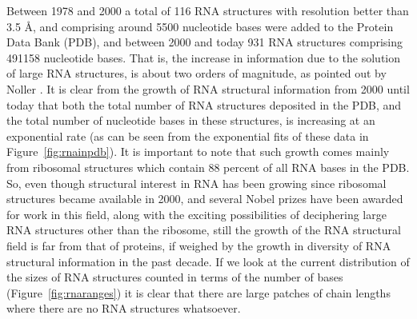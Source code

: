 \noindent Between  1978 and  2000 a total  of 116 RNA  structures with
resolution better than 3.5  \AA, and comprising around 5500 nucleotide
bases were added to the Protein  Data Bank (PDB), and between 2000 and
today  931  RNA  structures  comprising  491158  nucleotide
bases.  That  is, the increase in  information due to  the solution of
large RNA structures, is about two orders of magnitude, as pointed out
by  Noller \cite{noller2005}.   It is  clear  from the  growth of  RNA
structural  information from  2000  until today  that  both the  total
number of RNA structures deposited in the PDB, and the total number of
nucleotide bases in these  structures, is increasing at an exponential
rate  (as can  be seen  from  the exponential  fits of  these data  in
Figure~\ref{fig:rnainpdb}).  It is important  to note that such growth
comes mainly from ribosomal structures which contain 88 percent of all
RNA bases in the PDB.  So,  even though structural interest in RNA has
been growing since ribosomal  structures became available in 2000, and
several Nobel prizes  have been awarded for work  in this field, along
with   the   exciting   possibilities   of   deciphering   large   RNA
\cite{weinberg2009}  structures  other than  the  ribosome, still  the
growth of  the RNA structural field  is far from that  of proteins, if
weighed by  the growth in  diversity of RNA structural  information in
the past decade.  If we look  at the current distribution of the sizes
of  RNA   structures  counted  in   terms  of  the  number   of  bases
(Figure~\ref{fig:rnaranges}) it is clear  that there are large patches
of chain lengths where there are no RNA structures whatsoever.

